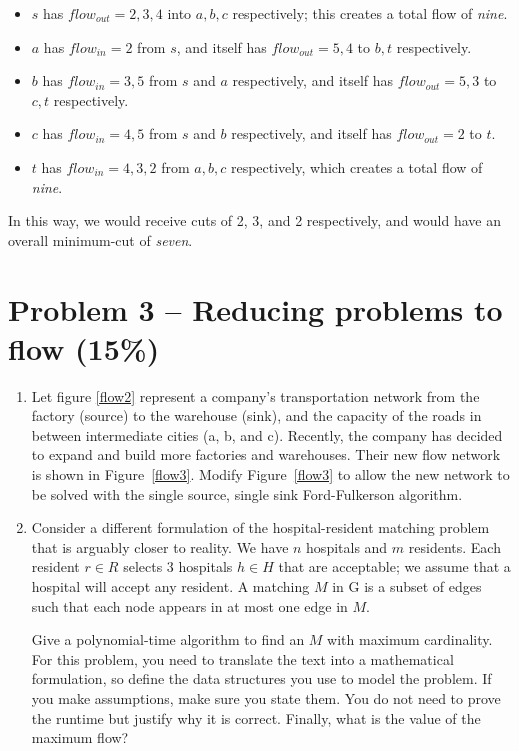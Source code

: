\documentclass[12pt,letterpaper]{article}
\begin{document}
\begin{itemize}
    \item $s$ has $flow_{out} = 2, 3, 4$ into $a, b, c$ respectively; this creates a total flow of \textit{nine}.
    \item $a$ has $flow_{in} = 2$ from $s$, and itself has $flow_{out} = 5, 4$ to $b, t$ respectively.
    \item $b$ has $flow_{in} = 3, 5$ from $s$ and $a$ respectively, and itself has $flow_{out} = 5, 3$ to $c, t$ respectively.
    \item $c$ has $flow_{in} = 4, 5$ from $s$ and $b$ respectively, and itself has $flow_{out} = 2$ to $t$.
    \item $t$ has $flow_{in} = 4, 3, 2$ from $a, b, c$ respectively, which creates a total flow of \textit{nine}.
\end{itemize}

In this way, we would receive cuts of 2, 3, and 2 respectively, and would have an overall minimum-cut of \textit{seven}. 

\newpage
\section*{Problem 3 -- Reducing problems to flow (15\%)}

\begin{enumerate}
    \item Let figure \ref{flow2} represent a company's transportation network from the factory (source) to the warehouse (sink), and the capacity of the roads in between intermediate cities (a, b, and c).
    Recently, the company has decided to expand and build more factories and warehouses.
    Their new flow network is shown in Figure~\ref{flow3}.
    Modify Figure~\ref{flow3} to allow the new network to be solved with the single source, single sink Ford-Fulkerson algorithm.
    \item Consider a different formulation of the hospital-resident matching problem that is arguably closer to reality.
We have $n$ hospitals and $m$ residents.
Each resident $r \in R$ selects $3$ hospitals $h \in H$ that are acceptable; we assume that a hospital will accept any resident.
A matching $M$ in G is a subset of edges such that each node appears in at most one edge in $M$.

Give a polynomial-time algorithm to find an $M$ with maximum cardinality.
For this problem, you need to translate the text into a mathematical formulation, so define the data structures you use to model the problem.
If you make assumptions, make sure you state them.
You do not need to prove the runtime but justify why it is correct.
Finally, what is the value of the maximum flow?


\end{enumerate}
\end{document}
